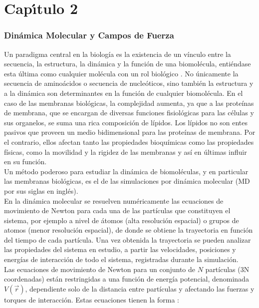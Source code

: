 \chapter{Cap\'{\i}tulo 2}
\subsection{Din\'{a}mica Molecular y Campos de Fuerza}\label{ss:md} 
Un paradigma central en la biolog\'{i}a es la existencia de un v\'{i}nculo entre la secuencia, la estructura, la din\'{a}mica y la funci\'{o}n de una biomol\'{e}cula, enti\'{e}ndase esta \'{u}ltima como cualquier mol\'{e}cula con un rol biol\'{o}gico \cite{Cui2006}. No \'{u}nicamente la secuencia de amino\'{a}cidos o secuencia de nucle\'{o}ticos, sino tambi\'{e}n la estructura y a la din\'{a}mica son determinantes en la funci\'{o}n de cualquier biomol\'{e}cula. En el caso de las membranas biol\'{o}gicas, la complejidad aumenta, ya que a las prote\'{i}nas de membrana, que se encargan de diversas funciones fisiol\'{o}gicas para las c\'{e}lulas y sus organelos, se suma una rica composici\'{o}n de l\'{i}pidos. Los l\'{i}pidos no son entes pasivos que proveen un medio bidimensional para las prote\'{i}nas de membrana. Por el contrario, ellos afectan tanto las propiedades bioqu\'{i}micas como las propiedades f\'{i}sicas, como la movilidad y la rigidez de las membranas y as\'{i} en \'{u}ltimas influir en su funci\'{o}n.\\

Un m\'{e}todo poderoso para estudiar la din\'{a}mica de biomol\'{e}culas, y en particular las membranas biol\'{o}gicas, es el de las simulaciones por din\'{a}mica molecular (MD por sus siglas en ingl\'{e}s).\\

En la din\'{a}mica molecular se resuelven num\'{e}ricamente las ecuaciones de movimiento de Newton para cada una de las part\'{i}culas que constituyen el sistema, por ejemplo a nivel de \'{a}tomos (alta resoluci\'{o}n espacial) o grupos de atomos (menor resoluci\'{o}n espacial), de donde se obtiene la trayectoria en funci\'{o}n del tiempo de cada part\'{i}cula. Una vez obtenida la trayectoria se pueden analizar las propiedades del sistema en estudio, a partir las velocidades, posiciones y energ\'{i}as de interacci\'{o}n de todo el sistema, registradas durante la simulaci\'{o}n.\\

Las ecuaciones de movimiento de Newton para un conjunto de $N$ part\'{i}culas (3N coordenadas) est\'{a}n restringidas a una funci\'{o}n de energ\'{i}a potencial, denominada $V(\vec{r})$, dependiente solo de la distancia entre part\'{i}culas y afectando las fuerzas y torques de interacci\'{o}n. Estas ecuaciones tienen la forma \cite{Goldstein2001}:

